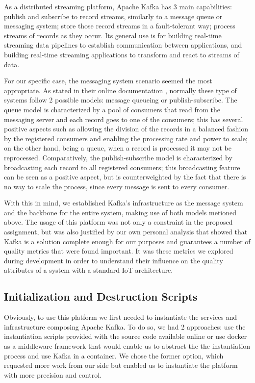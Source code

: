 \documentclass[12pt]{article}
\begin{document}
As a distributed streaming platform, Apache Kafka has 3 main capabilities: publish and subscribe to record streams, similarly to a message queue or 
messaging system; store those record streams in a fault-tolerant way; process streams of records as they occur. 
Its general use is for building real-time streaming data pipelines to establish communication between applications, and building real-time streaming applications 
to transform and react to streams of data.

For our specific case, the messaging system scenario seemed the most appropriate.
As stated in their online documentation \cite{kafka}, normally these type of systems follow 2 possible models: message queueing or publish-subscribe. 
The queue model is characterized by a pool of consumers that read from the messaging server and each record goes to one of the consumers; 
this has several positive aspects such as allowing the division of the records in a balanced fashion by the registered consumers and enabling the processing rate 
and power to scale; on the other hand, being a queue, when a record is processed it may not be reprocessed.
Comparatively, the publish-subscribe model is characterized by broadcasting each record to all registered consumers; this broadcasting feature can be seen as a 
positive aspect, but is counterweighted by the fact that there is no way to scale the process, since every message is sent to every consumer.

With this in mind, we established Kafka's infrastructure as the message system and the backbone for the entire system, making use of both models metioned above.
The usage of this platform was not only a constraint in the proposed assignment, but was also justified by our own personal analysis that showed that Kafka is a 
solution complete enough for our purposes and guarantees a number of quality metrics that were found important.
It was these metrics we explored during development in order to understand their influence on the quality attributes of a system with a standard IoT architecture. 

\subsection{Initialization and Destruction Scripts} %

Obviously, to use this platform we first needed to instantiate the services and infrastructure composing Apache Kafka. 
To do so, we had 2 approaches: use the instantiation scripts provided with the source code available online \cite{kafka} or use docker as a middleware 
framework that would enable us to abstract the the instantiation process and use Kafka in a container. 
We chose the former option, which requested more work from our side but enabled us to instantiate the platform with more precision and control.
\end{document}
